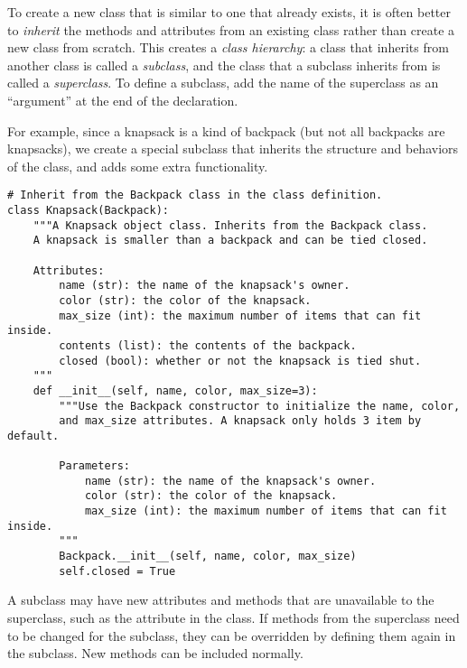 To create a new class that is similar to one that already exists, it is often better to \emph{inherit} the methods and attributes from an existing class rather than create a new class from scratch.
This creates a \emph{class hierarchy}: a class that inherits from another class is called a \emph{subclass}, and the class that a subclass inherits from is called a \emph{superclass}.
To define a subclass, add the name of the superclass as an ``argument'' at the end of the  declaration.

For example, since a knapsack is a kind of backpack (but not all backpacks are knapsacks), we create a special  subclass that inherits the structure and behaviors of the  class, and adds some extra functionality.

\begin{lstlisting}
# Inherit from the Backpack class in the class definition.
class Knapsack(Backpack):
    """A Knapsack object class. Inherits from the Backpack class.
    A knapsack is smaller than a backpack and can be tied closed.

    Attributes:
        name (str): the name of the knapsack's owner.
        color (str): the color of the knapsack.
        max_size (int): the maximum number of items that can fit inside.
        contents (list): the contents of the backpack.
        closed (bool): whether or not the knapsack is tied shut.
    """
    def __init__(self, name, color, max_size=3):
        """Use the Backpack constructor to initialize the name, color,
        and max_size attributes. A knapsack only holds 3 item by default.

        Parameters:
            name (str): the name of the knapsack's owner.
            color (str): the color of the knapsack.
            max_size (int): the maximum number of items that can fit inside.
        """
        Backpack.__init__(self, name, color, max_size)
        self.closed = True
\end{lstlisting}

A subclass may have new attributes and methods that are unavailable to the superclass, such as the  attribute in the  class.
If methods from the superclass need to be changed for the subclass, they can be overridden by defining them again in the subclass.
New methods can be included normally.

